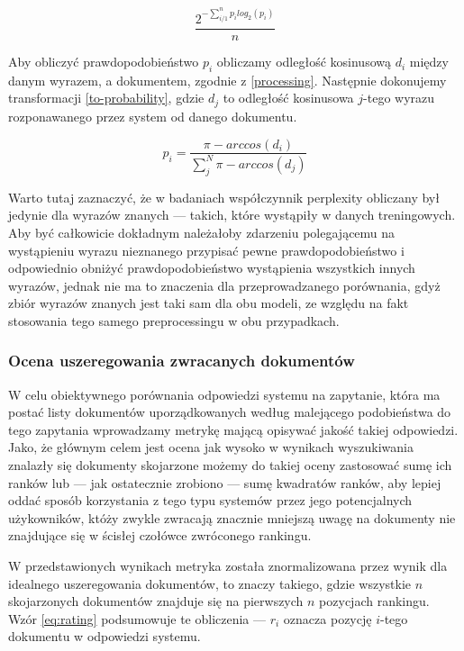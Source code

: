 \documentclass[11pt,a4paper]{article}
\begin{document}
\begin{equation}
  \label{perplexity}
  \frac{2^{-\sum_{i/1}^n p_ilog_2(p_i)}}{n}
\end{equation}

Aby obliczyć prawdopodobieństwo $p_i$ obliczamy odległość kosinusową $d_i$
między danym wyrazem, a dokumentem, zgodnie z \ref{processing}. Następnie
dokonujemy transformacji \ref{to-probability}, gdzie $d_j$ to odległość
kosinusowa $j$-tego wyrazu rozponawanego przez system od danego dokumentu.

\begin{equation}
  \label{to-probability}
  p_i = \frac{\pi - arccos(d_i)}{\sum_j^N \pi - arccos(d_j)}
\end{equation}

Warto tutaj zaznaczyć, że w badaniach współczynnik perplexity obliczany był
jedynie dla wyrazów znanych --- takich, które wystąpiły w danych treningowych.
Aby być całkowicie dokładnym należałoby zdarzeniu polegającemu na wystąpieniu
wyrazu nieznanego przypisać pewne prawdopodobieństwo i odpowiednio obniżyć
prawdopodobieństwo wystąpienia wszystkich innych wyrazów, jednak nie ma to
znaczenia dla przeprowadzanego porównania, gdyż zbiór wyrazów znanych jest taki
sam dla obu modeli, ze względu na fakt stosowania tego samego preprocessingu w
obu przypadkach.

\subsubsection{Ocena uszeregowania zwracanych dokumentów}
\label{sec:ranking}

W celu obiektywnego porównania odpowiedzi systemu na zapytanie, która ma postać
listy dokumentów uporządkowanych według malejącego podobieństwa do tego
zapytania wprowadzamy metrykę mającą opisywać jakość takiej odpowiedzi. Jako,
że głównym celem jest ocena jak wysoko w wynikach wyszukiwania znalazły się
dokumenty skojarzone możemy do takiej oceny zastosować sumę ich ranków lub ---
jak ostatecznie zrobiono --- sumę kwadratów ranków, aby lepiej oddać sposób
korzystania z tego typu systemów przez jego potencjalnych użykowników, któży
zwykle zwracają znacznie mniejszą uwagę na dokumenty nie znajdujące się w
ścisłej czołówce zwróconego rankingu.

W przedstawionych wynikach metryka została znormalizowana przez wynik dla
idealnego uszeregowania dokumentów, to znaczy takiego, gdzie wszystkie $n$
skojarzonych dokumentów znajduje się na pierwszych $n$ pozycjach rankingu. Wzór
\ref{eq:rating} podsumowuje te obliczenia --- $r_i$ oznacza pozycję $i$-tego
dokumentu w odpowiedzi systemu.
\end{document}
